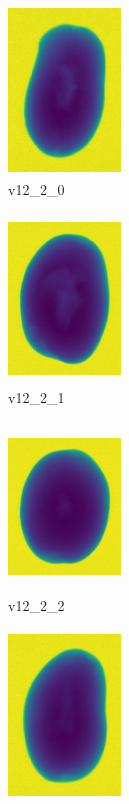 \documentclass[11pt]{article}
\begin{document}
\begin{figure}
     \centering
     \begin{subfigure}[b]{0.15\textwidth}
         \centering
         \includegraphics[width=3cm, height=4.5cm]{images/kartofler/v12_2_0_cut.png}
         \caption{v12\_2\_0}
         \label{fig:y equals x}
     \end{subfigure}
     \hfill
     \begin{subfigure}[b]{0.15\textwidth}
         \centering
         \includegraphics[width=3cm, height=4.5cm]{images/kartofler/v12_2_1_cut.png}
        \caption{v12\_2\_1}
         \label{fig:three sin x}
     \end{subfigure}
     \hfill
     \begin{subfigure}[b]{0.15\textwidth}
         \centering
         \includegraphics[width=3cm, height=4.5cm]{images/kartofler/v12_2_2_cut.png}
        \caption{v12\_2\_2}
         \label{fig:five over x}
     \end{subfigure}
     \hfill
    \begin{subfigure}[b]{0.15\textwidth}
         \centering
         \includegraphics[width=3cm, height=4.5cm]{images/kartofler/v12_2_3_cut.png}

\end{subfigure}
\end{figure}
\end{document}
